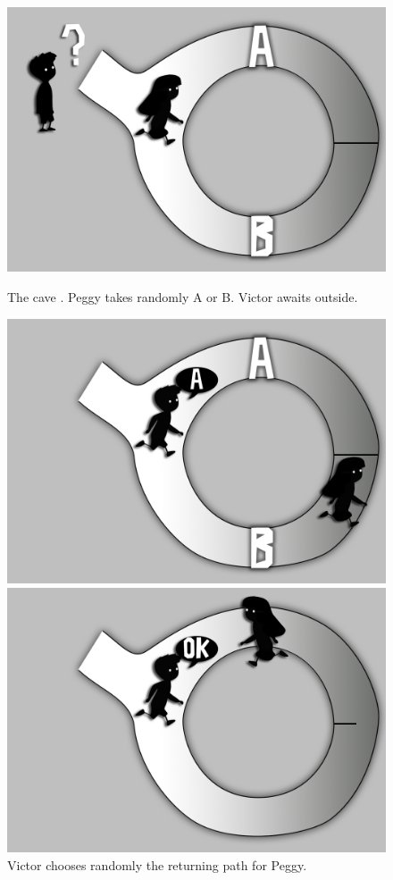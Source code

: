\begin{otherlanguage}{english}
\begin{figure}[!htb]
	\includegraphics[width=\linewidth]{gfx/graficoJL_ZKP_1}
	\caption*{The cave \citep{ZKPcave:fig}. Peggy takes randomly A or B. Victor awaits outside.}\label{fig:1}
	\endminipage\hfill
	\includegraphics[width=\linewidth]{gfx/graficoJL_ZKP_2}
	\caption*{Victor chooses randomly the returning path for Peggy.}\label{fig:2}
	\endminipage\hfill
	\includegraphics[width=\linewidth]{gfx/graficoJL_ZKP_3}

\end{figure}
\end{otherlanguage}
